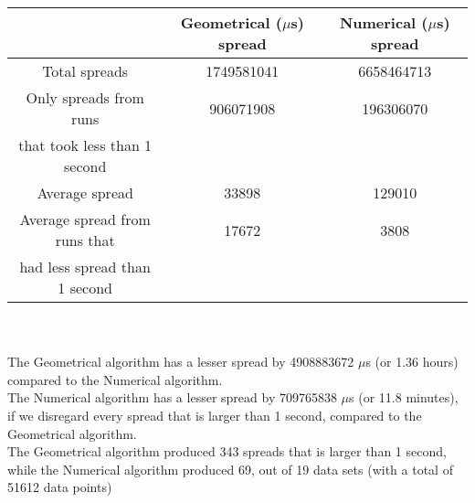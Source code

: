 \begin{tabular}[3]{c|c|c}
 & Geometrical ($\mu$s) spread & Numerical ($\mu$s) spread\\
\hline
Total spreads & 1749581041 & 6658464713 \\ 
\hline 
Only spreads from runs & 906071908 & 196306070 \\ 
that took less than 1 second & & \\ 
\hline
Average spread & 33898 & 129010 \\
\hline
Average spread from runs that & 17672 & 3808 \\ 
had less spread than 1 second & & \\ 
\end{tabular}\\ \\
The Geometrical algorithm has a lesser spread by 4908883672 $\mu$s (or 1.36 hours) compared to the Numerical algorithm.\\
The Numerical algorithm has a lesser spread by 709765838 $\mu$s (or 11.8 minutes), if we disregard every spread that is larger than 1 second, compared to the Geometrical algorithm.\\
The Geometrical algorithm produced 343 spreads that is larger than 1 second, while the Numerical algorithm produced 69, out of 19 data sets (with a total of 51612 data points)\\
